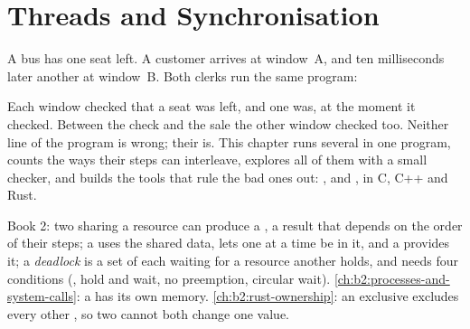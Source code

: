 \chapter{Threads and Synchronisation}\label{ch:b2:threads-and-synchronisation}

A bus has one seat left. A customer arrives at window~A, and ten milliseconds later another at window~B. Both clerks
run the same program:

\label{lst:b2:threads-and-synchronisation:sell}

\label{out:b2:threads-and-synchronisation:hook}

Each window checked that a seat was left, and one was, at the moment it checked. Between the check and the sale the
other window checked too. Neither line of the program is wrong; their  is. This chapter runs several
 in one program, counts the ways their steps can interleave, explores all of them with a small checker, and
builds the tools that rule the bad ones out: ,  and , in C, C++ and Rust.

\begin{recall}
Book 2: two  sharing a resource can produce a \emph{}, a result that depends on the order of
their steps; a \emph{} uses the shared data, \emph{} lets one  at a time be
in it, and a \emph{} provides it; a \emph{deadlock} is a set of  each
waiting for a resource another holds, and needs four conditions (, hold and wait, no preemption,
circular wait). \cref{ch:b2:processes-and-system-calls}: a  has its own memory. \cref{ch:b2:rust-ownership}:
an exclusive  excludes every other , so two  cannot both change one value.
\end{recall}

